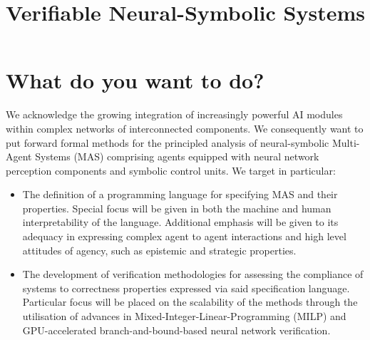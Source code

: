 \documentclass[11pt]{article}
\title{Verifiable Neural-Symbolic Systems}
\date{}
\begin{document}
\maketitle
\section{What do you want to do?}



We acknowledge the growing integration of increasingly
powerful AI modules within complex networks of
interconnected components. We consequently want to put
forward formal methods for the principled analysis of
neural-symbolic Multi-Agent Systems (MAS) comprising agents
equipped with neural network perception components and
symbolic control units. We target in particular:
\begin{itemize}
    \item  The definition of a programming language for
        specifying MAS and  their
        properties. Special focus will be given in both the
        machine and human interpretability of the language.
        Additional emphasis will be given to 
        its adequacy in expressing complex agent to
        agent interactions and high level attitudes of
        agency, such as epistemic and strategic properties.
    \item The development of  verification
        methodologies for assessing the compliance of
        systems  to correctness properties expressed via
        said specification language. Particular focus will
        be placed on the scalability of the methods through
        the utilisation of advances in
        Mixed-Integer-Linear-Programming (MILP) and
        GPU-accelerated branch-and-bound-based neural
        network verification.
\end{itemize}



\end{document}
